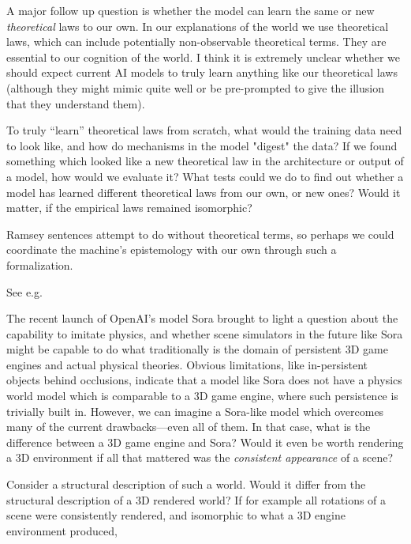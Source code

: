 \documentclass[11pt, oneside]{article}   	%
\begin{document}
A major follow up question is whether the model can learn the same or new \emph{theoretical} laws to our own.  In our explanations of the world we use theoretical laws, which can include potentially non-observable theoretical terms.  They are essential to our cognition of the world.  I think it is extremely unclear whether we should expect current AI models to truly learn anything like our theoretical laws (although they might mimic quite well or be pre-prompted to give the illusion that they understand them).  

To truly ``learn'' theoretical laws from scratch, what would the training data need to look like, and how do mechanisms in the model "digest" the data?  If we found something which looked like a new theoretical law in the architecture or output of a model, how would we evaluate it?  What tests could we do to find out whether a model has learned different theoretical laws from our own, or new ones?  Would it matter, if the empirical laws remained isomorphic?

Ramsey sentences attempt to do without theoretical terms, so perhaps we could coordinate the machine's epistemology with our own through such a formalization.  

See e.g. \citep[\S 26]{Carnap1966} 


The recent launch of OpenAI's model Sora \citep{Sora2024} brought to light a question about the capability to imitate physics, and whether scene simulators in the future like Sora might be capable to do what traditionally is the domain of persistent 3D game engines and actual physical theories.  Obvious limitations, like in-persistent objects behind occlusions, indicate that a model like Sora does not have a physics world model which is comparable to a 3D game engine, where such persistence is trivially built in.  However, we can imagine a Sora-like model which overcomes many of the current drawbacks---even all of them.  In that case, what is the difference between a 3D game engine and Sora?  Would it even be worth rendering a 3D environment if all that mattered was the \emph{consistent appearance} of a scene?

Consider a structural description of such a world. Would it differ from the structural description of a 3D rendered world? If for example all rotations of a scene were consistently rendered, and isomorphic to what a 3D engine environment produced, 
\end{document}

